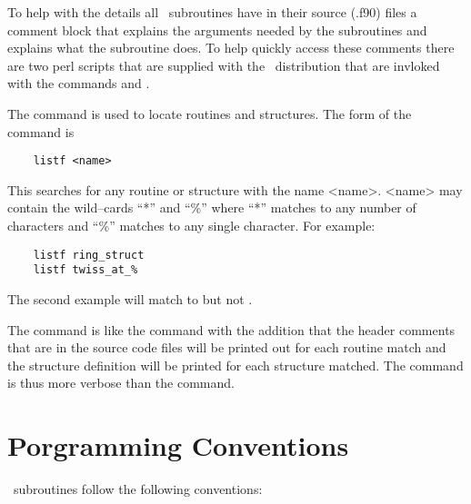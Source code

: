 To help with the details all \bmad\ subroutines have in their source (.f90)
files a comment block that explains the arguments needed by the
subroutines and explains what the subroutine does. To help quickly
access these comments there are two perl scripts that are supplied
with the \bmad\ distribution that are invloked with the commands
 and .

The  command is used to locate routines and structures.
The form of the command is
\begin{verbatim}
    listf <name>
\end{verbatim}
This searches for any routine or structure with the name
<name>. <name> may contain the wild--cards ``*'' and ``\%'' where
``*'' matches to any number of characters and ``\%'' matches to any
single character. For example:
\begin{verbatim}
    listf ring_struct
    listf twiss_at_%
\end{verbatim}
The second example will match to  but not
.

The  command is like the  command with the
addition that the header comments that are in the source code files
will be printed out for each routine match and the structure definition
will be printed for each structure matched. The  command is
thus more verbose than the  command.

\section{Porgramming Conventions}

\bmad\ subroutines follow the following conventions:

